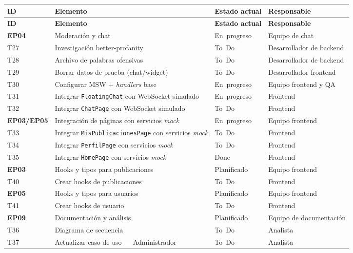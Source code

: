 \documentclass{article}
\begin{document}
\begin{longtable}{|l|p{8cm}|p{3cm}|p{4cm}|}
\hline
\textbf{ID} & \textbf{Elemento} & \textbf{Estado actual} & \textbf{Responsable} \\
\hline
\endfirsthead
\hline
\textbf{ID} & \textbf{Elemento} & \textbf{Estado actual} & \textbf{Responsable} \\
\hline
\endhead
\hline
\textbf{EP04} & Moderación y chat & En progreso & Equipo de chat \\
\hline
T27 & Investigación better‑profanity & To Do & Desarrollador de backend \\
\hline
T28 & Archivo de palabras ofensivas & To Do & Desarrollador de backend \\
\hline
T29 & Borrar datos de prueba (chat/widget) & To Do & Desarrollador frontend \\
\hline
T30 & Configurar MSW + \emph{handlers} base & En progreso & Equipo frontend y QA \\
\hline
T31 & Integrar \texttt{FloatingChat} con WebSocket simulado & En progreso & Frontend \\
\hline
T32 & Integrar \texttt{ChatPage} con WebSocket simulado & To Do & Frontend \\
\hline
\textbf{EP03/EP05} & Integración de páginas con servicios \emph{mock} & En progreso & Equipo frontend \\
\hline
T33 & Integrar \texttt{MisPublicacionesPage} con servicios \emph{mock} & To Do & Frontend \\
\hline
T34 & Integrar \texttt{PerfilPage} con servicios \emph{mock} & To Do & Frontend \\
\hline
T35 & Integrar \texttt{HomePage} con servicios \emph{mock} & Done & Frontend \\
\hline
\textbf{EP03} & Hooks y tipos para publicaciones & Planificado & Equipo frontend \\
\hline
T40 & Crear hooks de publicaciones & To Do & Frontend \\
\hline
\textbf{EP05} & Hooks y tipos para usuarios & Planificado & Equipo frontend \\
\hline
T41 & Crear hooks de usuario & To Do & Frontend \\
\hline
\textbf{EP09} & Documentación y análisis & Planificado & Equipo de documentación \\
\hline
T36 & Diagrama de secuencia & To Do & Analista \\
\hline
T37 & Actualizar caso de uso --- Administrador & To Do & Analista \\

\end{longtable}
\end{document}
